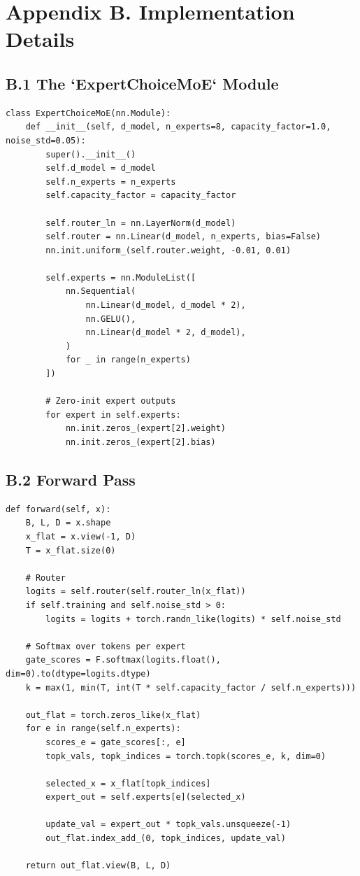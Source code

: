 \section{Appendix B. Implementation Details}

\subsection{B.1 The `ExpertChoiceMoE` Module}

\begin{lstlisting}
class ExpertChoiceMoE(nn.Module):
    def __init__(self, d_model, n_experts=8, capacity_factor=1.0, noise_std=0.05):
        super().__init__()
        self.d_model = d_model
        self.n_experts = n_experts
        self.capacity_factor = capacity_factor
        
        self.router_ln = nn.LayerNorm(d_model)
        self.router = nn.Linear(d_model, n_experts, bias=False)
        nn.init.uniform_(self.router.weight, -0.01, 0.01)
        
        self.experts = nn.ModuleList([
            nn.Sequential(
                nn.Linear(d_model, d_model * 2),
                nn.GELU(),
                nn.Linear(d_model * 2, d_model),
            )
            for _ in range(n_experts)
        ])
        
        # Zero-init expert outputs
        for expert in self.experts:
            nn.init.zeros_(expert[2].weight)
            nn.init.zeros_(expert[2].bias)
\end{lstlisting}

\subsection{B.2 Forward Pass}

\begin{lstlisting}
def forward(self, x):
    B, L, D = x.shape
    x_flat = x.view(-1, D)
    T = x_flat.size(0)
    
    # Router
    logits = self.router(self.router_ln(x_flat))
    if self.training and self.noise_std > 0:
        logits = logits + torch.randn_like(logits) * self.noise_std
    
    # Softmax over tokens per expert
    gate_scores = F.softmax(logits.float(), dim=0).to(dtype=logits.dtype)
    k = max(1, min(T, int(T * self.capacity_factor / self.n_experts)))
    
    out_flat = torch.zeros_like(x_flat)
    for e in range(self.n_experts):
        scores_e = gate_scores[:, e]
        topk_vals, topk_indices = torch.topk(scores_e, k, dim=0)
        
        selected_x = x_flat[topk_indices]
        expert_out = self.experts[e](selected_x)
        
        update_val = expert_out * topk_vals.unsqueeze(-1)
        out_flat.index_add_(0, topk_indices, update_val)
    
    return out_flat.view(B, L, D)
\end{lstlisting}

